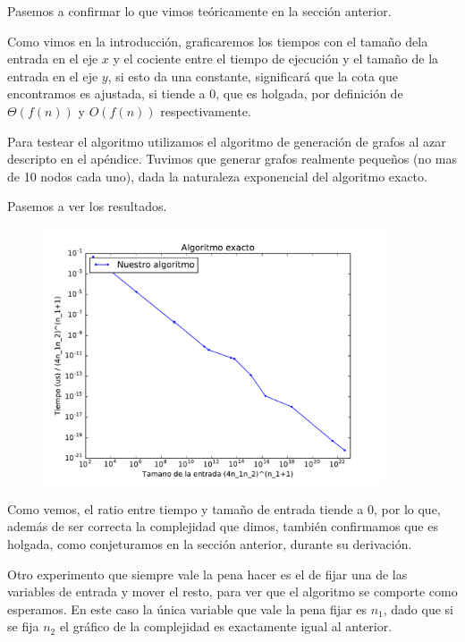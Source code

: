 Pasemos a confirmar lo que vimos teóricamente en la sección anterior.

Como vimos en la introducción, graficaremos los tiempos con el tamaño dela entrada en el eje $x$ y el cociente entre el tiempo de ejecución y el tamaño de la entrada en el eje $y$, si esto da una constante, significará que la cota que encontramos es ajustada, si tiende a 0, que es holgada, por definición de $\Theta(f(n))$ y $O(f(n))$ respectivamente.

Para testear el algoritmo utilizamos el algoritmo de generación de grafos al azar descripto en el ap\'endice. Tuvimos que generar grafos realmente pequeños (no mas de 10 nodos cada uno), dada la naturaleza exponencial del algoritmo exacto.

Pasemos a ver los resultados.

\begin{figure}[H]
 \centering
	\includegraphics[width=0.9\textwidth]{graficos/problema_2/tiempos_1.pdf}
	\caption{}
	\label{fig:problema2-1}
\end{figure}

Como vemos, el ratio entre tiempo y tamaño de entrada tiende a 0, por lo que, además de ser correcta la complejidad que dimos, tambi\'en confirmamos que es holgada, como conjeturamos en la sección anterior, durante su derivación.

Otro experimento que siempre vale la pena hacer es el de fijar una de las variables de entrada y mover el resto, para ver que el algoritmo se comporte como esperamos. En este caso la única variable que vale la pena fijar es $n_1$, dado que si se fija $n_2$ el gráfico de la complejidad es exactamente igual al anterior.


